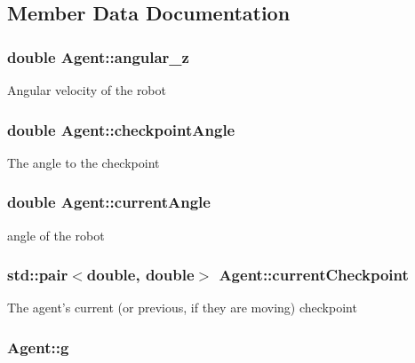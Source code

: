 \subsection{Member Data Documentation}
\hypertarget{classAgent_affc842049c5010a5f8bd99a62d650a25}{
\subsubsection[{angular\-\_\-z}]{\setlength{\rightskip}{0pt plus 5cm}double Agent\-::angular\-\_\-z\hspace{0.3cm}{\ttfamily [protected]}}}\label{classAgent_affc842049c5010a5f8bd99a62d650a25}
Angular velocity of the robot \hypertarget{classAgent_a894e975009220db4a8faa7c23fc0b4d6}{
\subsubsection[{checkpoint\-Angle}]{\setlength{\rightskip}{0pt plus 5cm}double Agent\-::checkpoint\-Angle\hspace{0.3cm}{\ttfamily [protected]}}}\label{classAgent_a894e975009220db4a8faa7c23fc0b4d6}
The angle to the checkpoint \hypertarget{classAgent_a389e3229e62da28d6c686354329e25aa}{
\subsubsection[{current\-Angle}]{\setlength{\rightskip}{0pt plus 5cm}double Agent\-::current\-Angle\hspace{0.3cm}{\ttfamily [protected]}}}\label{classAgent_a389e3229e62da28d6c686354329e25aa}
angle of the robot \hypertarget{classAgent_a0ca673bd13a3e9aa8235db73eb4b5391}{
\subsubsection[{current\-Checkpoint}]{\setlength{\rightskip}{0pt plus 5cm}std\-::pair$<$double, double$>$ Agent\-::current\-Checkpoint\hspace{0.3cm}{\ttfamily [protected]}}}\label{classAgent_a0ca673bd13a3e9aa8235db73eb4b5391}
The agent's current (or previous, if they are moving) checkpoint \hypertarget{classAgent_a9c296226b7db0471d7a721dabe849c46}{
\subsubsection[{g}]{ Agent\-::g\hspace{0.3cm}{\ttfamily [protected]}}}\label{classAgent_a9c296226b7db0471d7a721dabe849c46}
